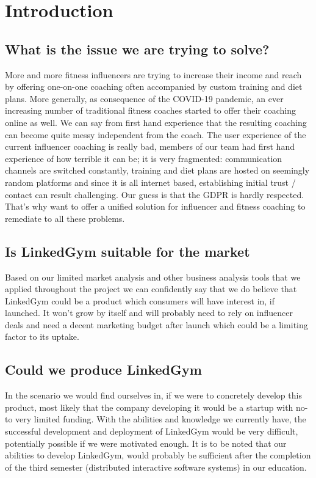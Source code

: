 \section{Introduction}

\subsection{What is the issue we are trying to solve?}
More and more fitness influencers are trying to increase their income and reach by offering one-on-one coaching often accompanied by custom training and diet plans. More generally, as consequence of the COVID-19 pandemic, an ever increasing number of traditional fitness coaches started to offer their coaching online as well.
We can say from first hand experience that the resulting coaching can become quite messy independent from the coach.
The user experience of the current influencer coaching is really bad, members of our team had first hand experience of how terrible it can be; it is very fragmented: communication channels are switched constantly, training and diet plans are hosted on seemingly random platforms and since it is all internet based, establishing initial trust / contact can result challenging. Our guess is that the GDPR is hardly respected.
That's why want to offer a unified solution for influencer and fitness coaching to remediate to all these problems.

\subsection{Is LinkedGym suitable for the market}

Based on our limited market analysis and other business analysis tools that we applied throughout the project we can confidently say that we do believe that LinkedGym could be a product which consumers will have interest in, if launched. It won't grow by itself and will probably need to rely on influencer deals and need a decent marketing budget after launch which could be a limiting factor to its uptake.

\subsection{Could we produce LinkedGym}
In the scenario we would find ourselves in, if we were to concretely develop this product, most likely that the company developing it would be a startup with no- to very limited funding. With the abilities and knowledge we currently have, the successful development and deployment of LinkedGym would be very difficult, potentially possible if we were motivated enough. It is to be noted that our abilities to develop LinkedGym, would probably be sufficient after the completion of the third semester (distributed interactive software systems) in our education.

